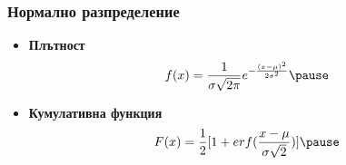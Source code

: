 \begin{frame}
  \frametitle{Нормално разпределение}
  \begin{itemize}
  \item \textbf{Плътност}
  \begin{equation*}
      f(x) = \frac{1}{\sigma \sqrt{2 \pi}} e^{-\frac{(x-\mu)^2}{2\sigma^2}} \pause
  \end{equation*}
  \item \textbf{Кумулативна функция}
  \begin{equation*}
      F(x) = \frac{1}{2} [1 + erf(\frac{x-\mu}{\sigma\sqrt{2}})] \pause
  \end{equation*}
  \end{itemize}
\end{frame}

